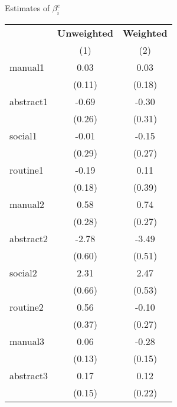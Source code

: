 \begin{center}
\begin{threeparttable}[!h]
\caption{Estimates of $\beta_{i}^e$}
\begin{tabular}{lcc}
\toprule
\toprule
&\multicolumn{1}{c}{\textbf{Unweighted}}&\multicolumn{1}{c}{\textbf{Weighted}} \\
\textbf{}&\multicolumn{1}{c}{(1)}&\multicolumn{1}{c}{(2)} \\
\midrule
manual1             &        0.03         &        0.03         \\
                    &      (0.11)         &      (0.18)         \\
abstract1           &       -0.69\sym{**} &       -0.30         \\
                    &      (0.26)         &      (0.31)         \\
social1             &       -0.01         &       -0.15         \\
                    &      (0.29)         &      (0.27)         \\
routine1            &       -0.19         &        0.11         \\
                    &      (0.18)         &      (0.39)         \\
manual2             &        0.58\sym{*}  &        0.74\sym{**} \\
                    &      (0.28)         &      (0.27)         \\
abstract2           &       -2.78\sym{***}&       -3.49\sym{***}\\
                    &      (0.60)         &      (0.51)         \\
social2             &        2.31\sym{***}&        2.47\sym{***}\\
                    &      (0.66)         &      (0.53)         \\
routine2            &        0.56         &       -0.10         \\
                    &      (0.37)         &      (0.27)         \\
manual3             &        0.06         &       -0.28         \\
                    &      (0.13)         &      (0.15)         \\
abstract3           &        0.17         &        0.12         \\
                    &      (0.15)         &      (0.22)         \\

\end{tabular}
\end{threeparttable}
\end{center}
